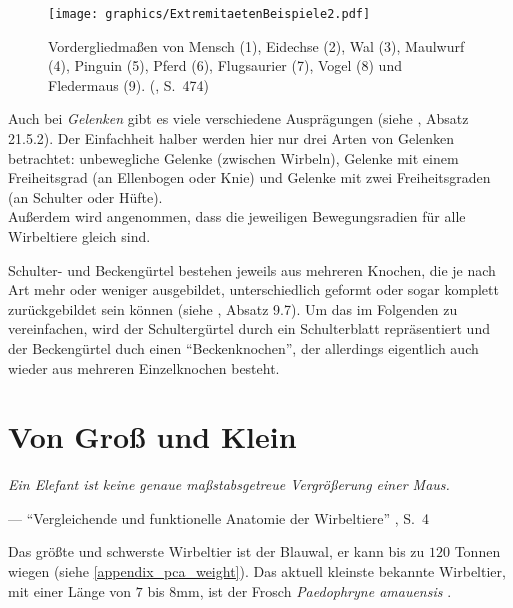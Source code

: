 \begin{figure}
 \centering
 \texttt{[image: graphics/ExtremitaetenBeispiele2.pdf]}
 \caption{Vordergliedmaßen von Mensch (1), Eidechse (2), Wal (3), Maulwurf (4), Pinguin (5), Pferd (6), Flugsaurier (7), Vogel (8) und Fledermaus (9). (\cite{dtvBiologie}, S.\ 474)}
 \label{bsp_extremitaeten2}
\end{figure}

Auch bei \emph{Gelenken} gibt es viele verschiedene Ausprägungen (siehe \cite{Vergleichende_Anatomie}, Absatz 21.5.2). Der Einfachheit halber werden hier nur drei Arten von Gelenken betrachtet: unbewegliche Gelenke (\zb zwischen Wirbeln), Gelenke mit einem Freiheitsgrad (\zb an Ellenbogen oder Knie) und Gelenke mit zwei Freiheitsgraden (\zb an Schulter oder Hüfte).
\\
Außerdem wird angenommen, dass die jeweiligen Bewegungsradien für alle Wirbeltiere gleich sind.

Schulter- und Beckengürtel bestehen  jeweils aus mehreren Knochen, die je nach Art mehr oder weniger ausgebildet, unterschiedlich geformt oder sogar komplett zurückgebildet sein können (siehe \cite{Vergleichende_Anatomie}, Absatz 9.7). Um das im Folgenden zu vereinfachen, wird der Schultergürtel durch ein Schulterblatt repräsentiert und der Beckengürtel duch einen "`Beckenknochen"', der allerdings eigentlich auch wieder aus mehreren Einzelknochen besteht.



\section{Von Groß und Klein}

\vspace{0.5cm}
\begin{center}
 \begin{minipage}{12cm}
  \emph{Ein Elefant ist keine genaue maßstabsgetreue Vergrößerung einer Maus.}
 
  --- "`Vergleichende und funktionelle Anatomie der Wirbeltiere"' \cite{Vergleichende_Anatomie}, S.\ 4
 \end{minipage}
\end{center}

Das größte und schwerste Wirbeltier ist der Blauwal, er kann bis zu $120$ Tonnen wiegen (siehe \ref{appendix_pca_weight}). Das aktuell kleinste bekannte Wirbeltier, mit einer Länge von $7$ bis $8$mm, ist der Frosch \emph{Paedophryne amauensis} \cite{smallestVertebrate}.

